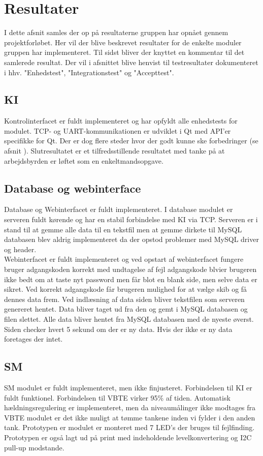 \section{Resultater}
\label{ch:Resultater}
I dette afsnit samles der op på resultaterne gruppen har opnået gennem projektforløbet. Her vil der blive beskrevet resultater for de enkelte moduler gruppen har implementeret. Til sidst bliver der knyttet en kommentar til det samlerede resultat. Der vil i afsnittet blive henvist til testresultater dokumenteret i hhv. "Enhedstest", "Integrationstest" og "Accepttest".

\subsection{KI}
Kontrolinterfacet er fuldt implementeret og har opfyldt alle enhedstests for modulet. TCP- og UART-kommunikationen er udviklet i Qt med API'er specifikke for Qt. Der er dog flere steder hvor der godt kunne ske forbedringer (se afsnit ). Slutresultatet er et tilfredsstillende resultatet med tanke på at arbejdsbyrden er løftet som en enkeltmandsopgave.\\

\subsection{Database og webinterface}
Database og Webinterfacet er fuldt implementeret. I database modulet er serveren fuldt kørende og har en stabil forbindelse med KI via TCP. Serveren er i stand til at gemme alle data til en tekstfil men at gemme dirkete til MySQL databasen blev aldrig implementeret da der opstod problemer med MySQL driver og header.\\
Webinterfacet er fuldt implementeret og ved opstart af webinterfacet fungere bruger adgangskoden korrekt med undtagelse af fejl adgangskode blvier brugeren ikke bedt om at taste nyt password men får blot en blank side, men selve data er sikret. Ved korrekt adgangskode får brugeren mulighed for at vælge skib og få dennes data frem. Ved indlæsning af data siden bliver tekstfilen som serveren genereret hentet. Data bliver taget ud fra den og gemt i MySQL databasen og filen slettet. Alle data bliver hentet fra MySQL databasen med de nyeste øverst. Siden checker hvert 5 sekund om der er ny data. Hvis der ikke er ny data foretages der intet.

\subsection{SM}
SM modulet er fuldt implementeret, men ikke finjusteret. Forbindelsen til KI er fuldt funktionel. Forbindelsen til VBTE virker 95\% af tiden. Automatisk hældningsregulering er implementeret, men da niveaumålinger ikke modtages fra VBTE modulet er det ikke muligt at tømme tankene inden vi fylder i den anden tank. Prototypen er modulet er monteret med 7 LED's der bruges til fejlfinding. Prototypen er også lagt ud på print med indeholdende levelkonvertering og I2C pull-up modstande.

